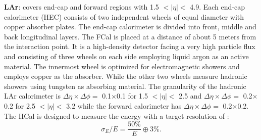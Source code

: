  \textbf{LAr}: covers end-cap and forward regions with 1.5 $ < |\eta| < $ 4.9. Each end-cap calorimeter (HEC) consists of two independent wheels of equal diameter with copper absorber plates. The end-cap calorimeter is divided into front, middle and back longitudinal layers. The FCal is placed at a distance of about 5 meters from the interaction point. It is a high-density detector facing a very high particle flux and consisting of three wheels on each side employing liquid argon as an active material. The innermost wheel is optimized for electromagnetic showers and employs copper as the absorber. While the other two wheels measure hadronic showers using tungsten as absorbing material. The granularity of the hadronic LAr calorimeter is $\Delta\eta\times\Delta\phi=$ 0.1$\times$0.1 for 1.5 $ < |\eta|< $ 2.5 and $\Delta\eta\times\Delta\phi=$ 0.2$\times$0.2 for 2.5 $ < |\eta| < $ 3.2 while the forward calorimeter has $\Delta\eta\times\Delta\phi=$ 0.2$\times$0.2.\\
 The HCal is designed to measure the energy with a target resolution of \cite{Tile_Perf}:
 \begin{equation}
     \sigma_E/E = \frac{50\%}{E} \oplus 3\%.
 \end{equation}

